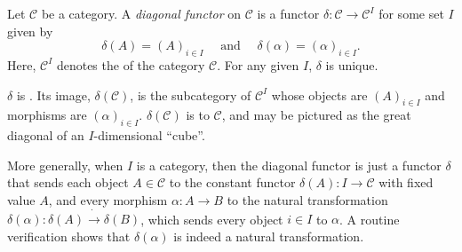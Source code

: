\documentclass[12pt]{article}
\begin{document}
Let $\mathcal{C}$ be a category.  A \emph{diagonal functor} on $\mathcal{C}$ is a functor $\delta:\mathcal{C}\to \mathcal{C}^I$ for some set $I$ given by
$$\delta(A)=(A)_{i\in I}\quad\mbox{ and }\quad \delta(\alpha)=(\alpha)_{i\in I}.$$
Here, $\mathcal{C}^I$ denotes the  of the category $\mathcal{C}$.  For any given $I$, $\delta$ is unique.

$\delta$ is .  Its image, $\delta(\mathcal{C})$, is the subcategory of $\mathcal{C}^I$ whose objects are $(A)_{i\in I}$ and morphisms are $(\alpha)_{i\in I}$.  $\delta(\mathcal{C})$ is  to $\mathcal{C}$, and may be pictured as the great diagonal of an $I$-dimensional ``cube''.

More generally, when $I$ is a category, then the diagonal functor is just a functor $\delta$ that sends each object $A\in \mathcal{C}$ to the constant functor $\delta(A):I\to \mathcal{C}$ with fixed value $A$, and every morphism $\alpha:A\to B$ to the natural transformation $\delta(\alpha):\delta(A)\dot{\to} \delta(B)$, which sends every object $i\in I$ to $\alpha$.  A routine verification shows that $\delta(\alpha)$ is indeed a natural transformation.
\end{document}
